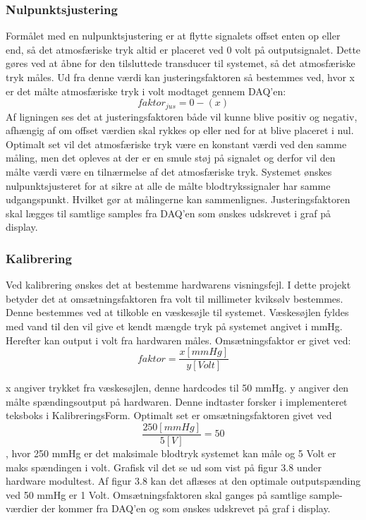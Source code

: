 \subsubsection{Nulpunktsjustering}
Formålet med en nulpunktsjustering er at flytte signalets offset enten op eller end, så det atmosfæriske tryk altid er placeret ved 0 volt på outputsignalet. Dette gøres ved at åbne for den tilsluttede transducer til systemet, så det atmosfæriske tryk måles. Ud fra denne værdi kan justeringsfaktoren så bestemmes ved, hvor x er det målte atmosfæriske tryk i volt modtaget gennem DAQ’en:
\begin{equation}
faktor_{jus}=0-(x)
\end{equation}
Af ligningen ses det at justeringsfaktoren både vil kunne blive positiv og negativ, afhængig af om offset værdien skal rykkes op eller ned for at blive placeret i nul. Optimalt set vil det atmosfæriske tryk være en konstant værdi ved den samme måling, men det opleves at der er en smule støj på signalet og derfor vil den målte værdi være en tilnærmelse af det atmosfæriske tryk. Systemet ønskes nulpunktsjusteret for at sikre at alle de målte blodtrykssignaler har samme udgangspunkt. Hvilket gør at målingerne kan sammenlignes. Justeringsfaktoren skal lægges til samtlige samples fra DAQ’en som ønskes udskrevet i graf på display. 

\subsubsection{Kalibrering}
Ved kalibrering ønskes det at bestemme hardwarens visningsfejl. I dette projekt betyder det at omsætningsfaktoren fra volt til millimeter kviksølv bestemmes. Denne bestemmes ved at tilkoble en væskesøjle til systemet. Væskesøjlen fyldes med vand til den vil give et kendt mængde tryk på systemet angivet i mmHg. Herefter kan output i volt fra hardwaren måles. Omsætningsfaktor er givet ved:
\begin{equation}
faktor=\dfrac{x [mmHg]}{y [Volt]}
\end{equation}

x angiver trykket fra væskesøjlen, denne hardcodes til 50 mmHg. y angiver den målte spændingsoutput på hardwaren. Denne indtaster forsker i implementeret teksboks i KalibreringsForm. Optimalt set er omsætningsfaktoren givet ved 
\begin{equation}
\dfrac{250 [mmHg]}{5 [V]}=50
\end{equation}
, hvor 250 mmHg er det maksimale blodtryk systemet kan måle og 5 Volt er maks spændingen i volt. Grafisk vil det se ud som vist på figur 3.8 under hardware modultest. Af figur 3.8 kan det aflæses at den optimale outputspænding ved 50 mmHg er 1 Volt. Omsætningsfaktoren skal ganges på samtlige sample-værdier der kommer fra DAQ’en og som ønskes udskrevet på graf i display. 

